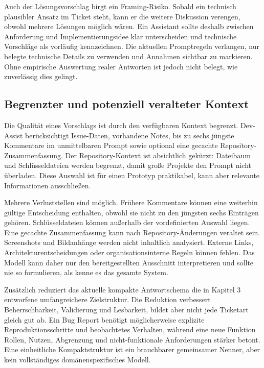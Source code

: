 Auch der Lösungsvorschlag birgt ein Framing-Risiko. Sobald ein technisch plausibler Ansatz im Ticket steht, kann er die weitere Diskussion verengen, obwohl mehrere Lösungen möglich wären. Ein Assistant sollte deshalb zwischen Anforderung und Implementierungsidee klar unterscheiden und technische Vorschläge als vorläufig kennzeichnen. Die aktuellen Promptregeln verlangen, nur belegte technische Details zu verwenden und Annahmen sichtbar zu markieren. Ohne empirische Auswertung realer Antworten ist jedoch nicht belegt, wie zuverlässig dies gelingt.

\subsection{Begrenzter und potenziell veralteter Kontext}

Die Qualität eines Vorschlags ist durch den verfügbaren Kontext begrenzt. Dev-Assist berücksichtigt Issue-Daten, vorhandene Notes, bis zu sechs jüngste Kommentare im unmittelbaren Prompt sowie optional eine gecachte Repository-Zusammenfassung. Der Repository-Kontext ist absichtlich gekürzt: Dateibaum und Schlüsseldateien werden begrenzt, damit große Projekte den Prompt nicht überladen. Diese Auswahl ist für einen Prototyp praktikabel, kann aber relevante Informationen ausschließen.

Mehrere Verluststellen sind möglich. Frühere Kommentare können eine weiterhin gültige Entscheidung enthalten, obwohl sie nicht zu den jüngsten sechs Einträgen gehören. Schlüsseldateien können außerhalb der vordefinierten Auswahl liegen. Eine gecachte Zusammenfassung kann nach Repository-Änderungen veraltet sein. Screenshots und Bildanhänge werden nicht inhaltlich analysiert. Externe Links, Architekturentscheidungen oder organisationsinterne Regeln können fehlen. Das Modell kann daher nur den bereitgestellten Ausschnitt interpretieren und sollte nie so formulieren, als kenne es das gesamte System.

Zusätzlich reduziert das aktuelle kompakte Antwortschema die in Kapitel 3 entworfene umfangreichere Zielstruktur. Die Reduktion verbessert Beherrschbarkeit, Validierung und Lesbarkeit, bildet aber nicht jede Ticketart gleich gut ab. Ein Bug Report benötigt möglicherweise explizite Reproduktionsschritte und beobachtetes Verhalten, während eine neue Funktion Rollen, Nutzen, Abgrenzung und nicht-funktionale Anforderungen stärker betont. Eine einheitliche Kompaktstruktur ist ein brauchbarer gemeinsamer Nenner, aber kein vollständiges domänenspezifisches Modell.

